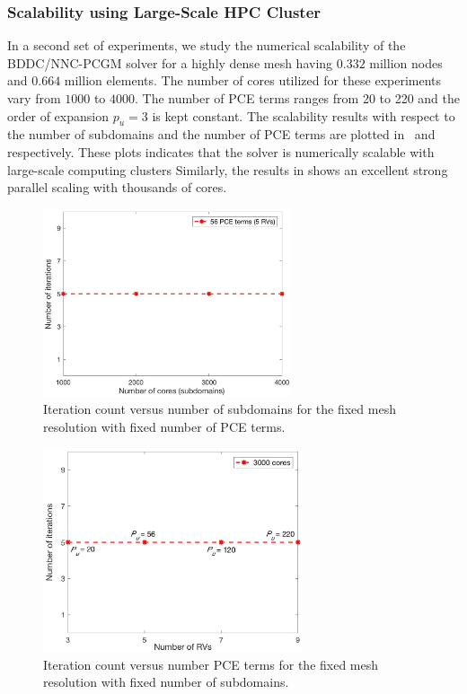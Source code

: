 \documentclass[letter,1p,11pt,oneside,onecolumn,sort&compress]{elsarticle}
\begin{document}
\subsubsection{Scalability using Large-Scale HPC Cluster}
In a second set of experiments, we study the numerical scalability of the BDDC/NNC-PCGM solver for a highly dense mesh having $0.332$ million nodes and $0.664$ million elements.
The number of cores utilized for these experiments vary from $1000$ to $4000$. The number of PCE terms ranges from 20 to 220 and the order of expansion $p_u=3$ is kept constant.
The scalability results with respect to the number of subdomains and the number of PCE terms are plotted in~ and  respectively. These plots indicates that the solver is numerically scalable with large-scale computing clusters
Similarly, the results in  shows an excellent strong parallel scaling with thousands of cores.
\begin{figure}[htbp]
\centering
\includegraphics[width=0.65\textwidth,height=0.35\textheight]{plots/cedar_nIterVnProc.eps}
\caption{Iteration count versus number of subdomains for the fixed mesh resolution with fixed number of PCE terms.}
\label{fig:cedar_nIterVnProc}
\end{figure}
\begin{figure}[htbp]
\centering
\includegraphics[width=0.68\textwidth,height=0.35\textheight]{plots/cedar_nIterVnPCE.eps}
\caption{Iteration count versus number PCE terms for the fixed mesh resolution with fixed number of subdomains.}
\label{fig:cedar_nIterVnPCE}
\end{figure}
\end{document}
